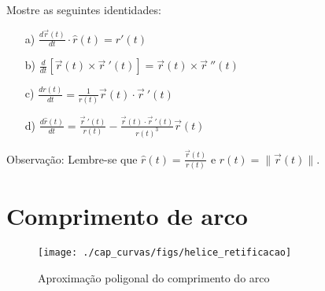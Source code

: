 \begin{exer} Mostre as seguintes identidades:
\begin{itemize}
\item[a)] $\displaystyle \frac{d\vec{r}(t)}{dt}\cdot \hat{r}(t)=r'(t)$
\item[b)] $\displaystyle \frac{d}{dt}\left[\vec{r}(t)\times\vec{r}~\!'(t)\right]=\vec{r}(t)\times\vec{r}~\!''(t)$
\item[c)] $\displaystyle \frac{d r(t)}{dt}=\frac{1}{r(t)} \vec{r}(t)\cdot\vec{r}~\!'(t)$
\item[d)] $\displaystyle \frac{d\hat{r}(t)}{dt}=\frac{\vec{r}~\!'(t)}{r(t)}-\frac{\vec{r}(t)\cdot\vec{r}~\!'(t)}{r(t)^3}\vec{r}(t)$
\end{itemize}
Observação: Lembre-se que $\hat{r}(t)=\frac{\vec{r}(t)}{r(t)}$ e $r(t)=\|\vec{r}(t)\|$.

\end{exer}




 
\section{Comprimento de arco}
  
\begin{figure}
\centering
    \texttt{[image: ./cap\_curvas/figs/helice\_retificacao]}
\caption{Aproximação poligonal do comprimento do arco}\label{fig_compr_arc}
\end{figure}

 
 
